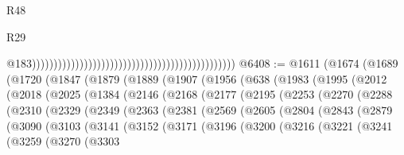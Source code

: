 \begin{lexlean}{R48}
\begin{lexlean}{R29}
\begin{coremodule}
{{{{{{{{{{{{{{{{{{{{{{{{{{{{{{{{{{{{{{{{{{{{{{{{{{{{{{{{{{{{{{{{{{{{{{{{{{{{{{{{{{{{{{{{{{{{{{{{{{{{{{{{{{{{{{{{{{{{{{{{{{{{{{{{{{{{{{{{{{{{{{{{{{{{{{{{{{{{{{{{{{{{{{{{{{{{{{{{{{{{{{{{{{{{{{{{{{{{{{{{{{{{{{{{{{{{{{{{{{                                                                                                  @183)))))))))))))))))))))))))))))))))))))))))))))))
@6408 := @1611
    (@1674
      (@1689
        (@1720
          (@1847
            (@1879
              (@1889
                (@1907
                  (@1956
                    (@638
                      (@1983
                        (@1995
                          (@2012
                            (@2018
                              (@2025
                                (@1384
                                  (@2146
                                    (@2168
                                      (@2177
                                        (@2195
                                          (@2253
                                            (@2270
                                              (@2288
                                                (@2310
                                                  (@2329
                                                    (@2349
                                                      (@2363
                                                        (@2381
                                                          (@2569
                                                            (@2605
                                                              (@2804
                                                                (@2843
                                                                  (@2879
                                                                    (@3090
                                                                      (@3103
                                                                        (@3141
                                                                          (@3152
                                                                            (@3171
                                                                              (@3196
                                                                                (@3200
                                                                                  (@3216
                                                                                    (@3221
                                                                                      (@3241
                                                                                        (@3259
                                                                                          (@3270
                                                                                            (@3303
}}}}}}}}}}}}}}}}}}}}}}}}}}}}}}}}}}}}}}}}}}}}}}}}}}}}}}}}}}}}}}}}}}}}}}}}}}}}}}}}}}}}}}}}}}}}}}}}}}}}}}}}}}}}}}}}}}}}}}}}}}}}}}}}}}}}}}}}}}}}}}}}}}}}}}}}}}}}}}}}}}}}}}}}}}}}}}}}}}}}}}}}}}}}}}}}}}}}}}}}}}}}}}}}}}}}}}}}}}
\end{coremodule}
\end{lexlean}
\end{lexlean}
